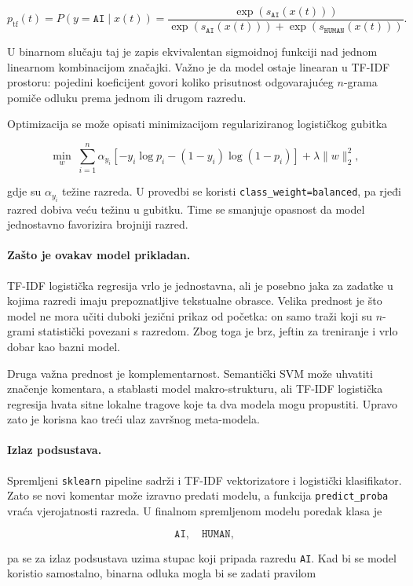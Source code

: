 \[
p_{\mathrm{tf}}(t)
=P(y=\texttt{AI}\mid x(t))
=\frac{\exp(s_{\texttt{AI}}(x(t)))}{\exp(s_{\texttt{AI}}(x(t)))+\exp(s_{\texttt{HUMAN}}(x(t)))}.
\]

U binarnom slučaju taj je zapis ekvivalentan sigmoidnoj funkciji nad jednom linearnom kombinacijom značajki. Važno je da model ostaje linearan u TF-IDF prostoru: pojedini koeficijent govori koliko prisutnost odgovarajućeg $n$-grama pomiče odluku prema jednom ili drugom razredu.

Optimizacija se može opisati minimizacijom regulariziranog logističkog gubitka

\[
\min_w\;
\sum_{i=1}^{n}\alpha_{y_i}
\left[-y_i\log p_i-(1-y_i)\log(1-p_i)\right]
+\lambda\|w\|_2^2,
\]

gdje su $\alpha_{y_i}$ težine razreda. U provedbi se koristi \texttt{class\_weight=balanced}, pa rjeđi razred dobiva veću težinu u gubitku. Time se smanjuje opasnost da model jednostavno favorizira brojniji razred.

\paragraph{Zašto je ovakav model prikladan.}
TF-IDF logistička regresija vrlo je jednostavna, ali je posebno jaka za zadatke u kojima razredi imaju prepoznatljive tekstualne obrasce. Velika prednost je što model ne mora učiti duboki jezični prikaz od početka: on samo traži koji su $n$-grami statistički povezani s razredom. Zbog toga je brz, jeftin za treniranje i vrlo dobar kao bazni model.

Druga važna prednost je komplementarnost. Semantički SVM može uhvatiti značenje komentara, a stablasti model makro-strukturu, ali TF-IDF logistička regresija hvata sitne lokalne tragove koje ta dva modela mogu propustiti. Upravo zato je korisna kao treći ulaz završnog meta-modela.

\paragraph{Izlaz podsustava.}
Spremljeni \texttt{sklearn} pipeline sadrži i TF-IDF vektorizatore i logistički klasifikator. Zato se novi komentar može izravno predati modelu, a funkcija \texttt{predict\_proba} vraća vjerojatnosti razreda. U finalnom spremljenom modelu poredak klasa je

\[
\texttt{AI},\quad \texttt{HUMAN},
\]

pa se za izlaz podsustava uzima stupac koji pripada razredu \texttt{AI}. Kad bi se model koristio samostalno, binarna odluka mogla bi se zadati pravilom


